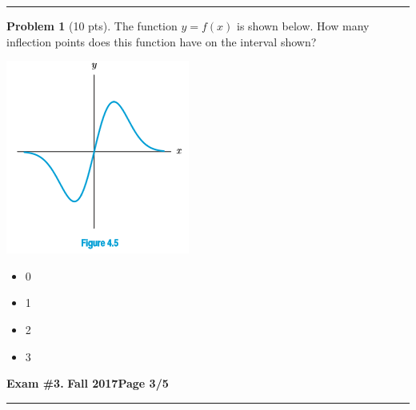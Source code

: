 \documentclass[12pt]{article}
\makeatletter
\theoremstyle{definition}
\newtheorem{problem}{Problem}
\newcommand*{\radiobutton}{%
  \@ifstar{\@radiobutton0}{\@radiobutton1}%
}
\newcommand*{\@radiobutton}[1]{%
  \begin{tikzpicture}
    \pgfmathsetlengthmacro\radius{height("X")/2}
    \draw[radius=\radius] circle;
    \ifcase#1 \fill[radius=.6*\radius] circle;\fi
  \end{tikzpicture}%
}
\makeatother
\begin{document}
\vspace{3cm}
\hrule
\begin{problem}[10 pts]
The function $y=f(x)$ is shown below.  How many inflection points does this function have on the interval shown?
\begin{center}
\includegraphics{3graph1.png}
\end{center}
\begin{itemize}
\item[\radiobutton] 0
\item[\radiobutton] 1
\item[\radiobutton] 2
\item[\radiobutton] 3
\end{itemize}
\end{problem}
\newpage

\hfill{\large\bf Exam \#3.}\hfill{\large\bf
  Fall 2017}\hfill{\large\bf Page 3/5}\hrule
\end{document}
